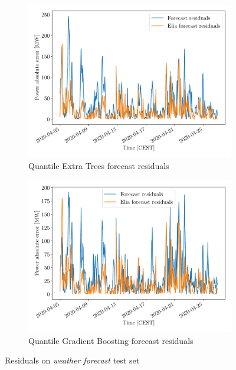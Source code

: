 \documentclass[a4paper, 12pt]{article}
\begin{document}
	\begin{figure}[h]
		\centering
		\begin{subfigure}[t]{0.48\textwidth}
			\centering
			\includegraphics[width=\textwidth]{resources/pdf/wind_res_qxt.pdf}
			\caption{Quantile Extra Trees forecast residuals}
			\label{fig:wind_res_qxt}
		\end{subfigure}
		\hspace{0.5em}
		\begin{subfigure}[t]{0.48\textwidth}
			\centering
			\includegraphics[width=\textwidth]{resources/pdf/wind_res_qgb.pdf}
			\caption{Quantile Gradient Boosting forecast residuals}
			\label{fig:wind_res_qgb}
		\end{subfigure}
		\caption{Residuals on \emph{weather forecast} test set}
	\end{figure}
	
\end{document}

